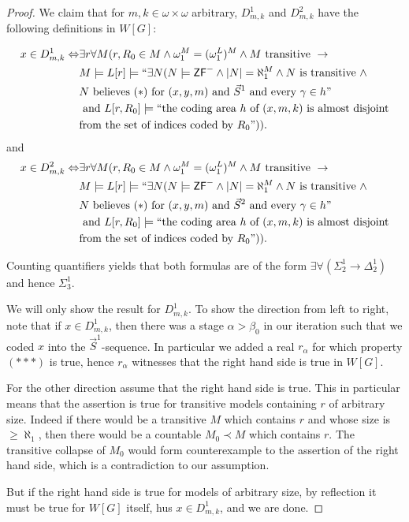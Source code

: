 \documentclass[a4paper,11pt]{article}
\newcommand{\ZFP}{\mathsf{ZF}^-}
\begin{document}
\begin{proof}
 We claim that for $m,k \in \omega \times \omega$ arbitrary, $D^1_{m,k}$ and $D^2_{m,k}$ have the following definitions in $W[G]$:
 
 \begin{align*}
 x \in D_{m,k}^1 \Leftrightarrow & \exists r \forall M (r, R_0 \in M \land \omega_1^M=(\omega_1^L)^M \land M \text{ transitive } \rightarrow  \\ &M \models L[r] \models ``\exists N ( N \models \ZFP \land |N| = \aleph_1^M  \land N \text{ is transitive } \land \\ &N \text{ believes $(\ast)$ for $(x,y,m)$ and $\vec{S}^1$ and every $\gamma \in h"$} \\&\text{ and $L[r,R_0] \models``$the coding area $h$ of $(x,m,k)$ is almost disjoint} \\&
 \text{from the set of indices coded by $R_0"$} )).
\end{align*}
and
\begin{align*}
x \in D_{m,k}^2 \Leftrightarrow & \exists r \forall M (r, R_0 \in M \land \omega_1^M=(\omega_1^L)^M \land M \text{ transitive } \rightarrow  \\ &M \models L[r] \models ``\exists N ( N \models \ZFP \land |N| = \aleph_1^M  \land N \text{ is transitive } \land \\ &N \text{ believes $(\ast)$ for $(x,y,m)$ and $\vec{S}^2$ and every $\gamma \in h"$} \\&\text{ and $L[r,R_0] \models``$the coding area $h$ of $(x,m,k)$ is almost disjoint} \\&
 \text{from the set of indices coded by $R_0"$} )).
\end{align*}
 
Counting quantifiers yields that both formulas are of the form $\exists \forall (\Sigma^1_2 \rightarrow \Delta^1_2)$ and hence $\Sigma^1_3$.

We will only show the result for $D_{m,k}^1$.
To show the direction from left to right, note that if $x \in D_{m,k}^1$, then 
there was a stage $\alpha>\beta_0$ in our iteration such that we coded $x$ into the $\vec{S}^1$-sequence. In particular we added a real $r_{\alpha}$ for which property $({\ast}{\ast}{\ast} )$ is true, hence $r_{\alpha}$ witnesses that the right hand side is true in $W[G]$.


For the other direction assume that the right hand side is true. This in particular means that the assertion is true for transitive models containing $r$ of arbitrary size. Indeed if there would be a transitive $M$ which contains $r$ and whose size is $\ge \aleph_1$, then there would be a countable $M_0 \prec M$ which contains $r$. The transitive collapse of $M_0$ would form counterexample to the assertion of the right hand side, which is a contradiction to our assumption.

But if the right hand side is true for models of arbitrary size, by reflection it must be true for $W[G]$ itself, hus $x \in D_{m,k}^1$, and we are done. 

\end{proof}
\end{document}
